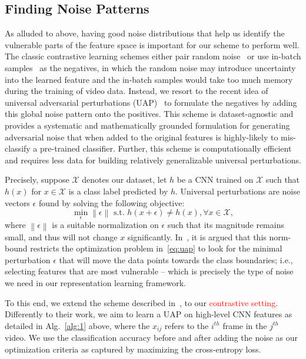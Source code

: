 \documentclass[runningheads]{llncs}
\newcommand{\norm}[1]{\left\|{#1}\right\|}
\newcommand{\dataset}{\mathcal{X}}
\begin{document}
\subsection{Finding Noise Patterns}
As alluded to above, having good noise distributions that help us identify the vulnerable parts of the feature space is important for our scheme to perform well. The classic contrastive learning schemes either pair random noise~\cite{tian2019contrastive,wang2018video} or use in-batch samples~\cite{chen2020simple,he2019momentum} as the negatives, in which the random noise may introduce uncertainty into the learned feature and the in-batch samples would take too much memory during the training of video data. Instead, we resort to the recent idea of universal adversarial perturbations (UAP)~\cite{moosavi2017universal} to formulate the negatives by adding this global noise pattern onto the positives. This scheme is dataset-agnostic and provides a systematic and mathematically grounded formulation for generating adversarial noise that when added to the original features is highly-likely to mis-classify a pre-trained classifier. Further, this scheme is computationally efficient and requires less data for building relatively generalizable universal perturbations.

Precisely, suppose $\dataset$ denotes our dataset, let $h$ be a CNN trained on $\dataset$ such that $h(x)$ for $x\in\dataset$ is a class label predicted by $h$. Universal perturbations are noise vectors $\epsilon$ found by solving the following objective:
\begin{equation}
\min_{\epsilon} \norm{\epsilon} \text{ s.t. } h(x+\epsilon) \neq h(x), \forall x \in \dataset,
\label{eq:uap}
\end{equation}
where $\norm{\epsilon}$ is a suitable normalization on $\epsilon$ such that its magnitude remains small, and thus will not change $x$ significantly. In~\cite{moosavi2017universal}, it is argued that this norm-bound restricts the optimization problem in~\eqref{eq:uap} to look for the minimal perturbation $\epsilon$ that will move the data points towards the class boundaries; i.e., selecting features that are most vulnerable -- which is precisely the type of noise we need in our representation learning framework. 



To this end, we extend the scheme described in~\cite{moosavi2017universal}, to our \textcolor{red}{contrastive setting}. Differently to their work, we aim to learn a UAP on high-level CNN features as detailed in Alg.~\ref{alg:1} above, where the $x_{ij}$ refers to the $i^{th}$ frame in the $j^{th}$ video. We use the classification accuracy before and after adding the noise as our optimization criteria as captured by maximizing the cross-entropy loss.
\end{document}
